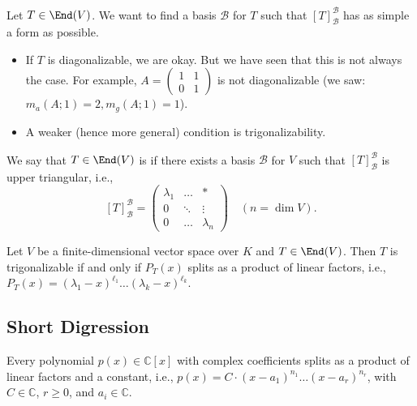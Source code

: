 \begin{question}\label{q:trig_basis}
  Let $T \in \End(V)$. We want to find a basis $\mathcal{B}$ for $T$ such that $[T]_{\mathcal{B}}^{\mathcal{B}}$ has as simple a form as possible.
\end{question}
\begin{itemize}
  \item If $T$ is diagonalizable, we are okay. But we have seen that this is not always the case. For example, $A = \left(\begin{smallmatrix} 1 & 1 \\ 0 & 1 \end{smallmatrix}\right)$ is not diagonalizable (we saw: $m_a(A; 1) = 2, m_g(A; 1) = 1$).
  \item A weaker (hence more general) condition is trigonalizability.
\end{itemize}

\begin{definition} \label{def:trigonalizable}
  We say that $T \in \End(V)$ is  if there exists a basis $\mathcal{B}$ for $V$ such that $[T]_{\mathcal{B}}^{\mathcal{B}}$ is upper triangular, i.e.,
  \begin{equation} \label{eq:upper_triangular_def}
    [T]_{\mathcal{B}}^{\mathcal{B}} = \begin{pmatrix} \lambda_1 & \dots & * \\ 0 & \ddots & \vdots \\ 0 & \dots & \lambda_n \end{pmatrix} \quad (n = \dim V).
  \end{equation}
\end{definition}

\begin{theorem} \label{thm:trig_condition}
  Let $V$ be a finite-dimensional vector space over $K$ and $T \in \End(V)$. Then $T$ is trigonalizable if and only if $P_T(x)$ splits as a product of linear factors, i.e., $P_T(x) = (\lambda_1 - x)^{\ell_1} \dots (\lambda_k - x)^{\ell_k}$.
\end{theorem}

\subsection*{Short Digression}

\begin{theorem} \label{thm:fta}
  Every polynomial $p(x) \in \mathbb{C}[x]$ with complex coefficients splits as a product of linear factors and a constant, i.e.,
  $p(x) = C \cdot (x-a_1)^{n_1} \dots (x-a_r)^{n_r}$, with $C \in \mathbb{C}$, $r \ge 0$, and $a_i \in \mathbb{C}$.
\end{theorem}

